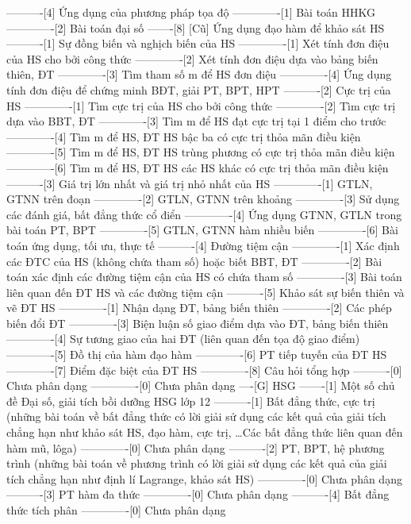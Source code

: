 ----------[4] Ứng dụng của phương pháp tọa độ
-------------[1] Bài toán HHKG
-------------[2] Bài toán đại số
-------[8] [Cũ] Ứng dụng đạo hàm để khảo sát HS
----------[1] Sự đồng biến và nghịch biến của HS
-------------[1] Xét tính đơn điệu của HS cho bởi công thức
-------------[2] Xét tính đơn điệu dựa vào bảng biến thiên, ĐT
-------------[3] Tìm tham số m để HS đơn điệu
-------------[4] Ứng dụng tính đơn điệu để chứng minh BĐT, giải PT, BPT, HPT
----------[2] Cực trị của HS
-------------[1] Tìm cực trị của HS cho bởi công thức
-------------[2] Tìm cực trị dựa vào BBT, ĐT
-------------[3] Tìm m để HS đạt cực trị tại 1 điểm cho trước
-------------[4] Tìm m để HS, ĐT HS bậc ba có cực trị thỏa mãn điều kiện
-------------[5] Tìm m để HS, ĐT HS trùng phương có cực trị thỏa mãn điều kiện
-------------[6] Tìm m để HS, ĐT HS các HS khác có cực trị thỏa mãn điều kiện
----------[3] Giá trị lớn nhất và giá trị nhỏ nhất của HS
-------------[1] GTLN, GTNN trên đoạn
-------------[2] GTLN, GTNN trên khoảng
-------------[3] Sử dụng các đánh giá, bất đẳng thức cổ điển
-------------[4] Ứng dụng GTNN, GTLN trong bài toán PT, BPT
-------------[5] GTLN, GTNN hàm nhiều biến
-------------[6] Bài toán ứng dụng, tối ưu, thực tế
----------[4] Đường tiệm cận
-------------[1] Xác định các ĐTC của HS (không chứa tham số) hoặc biết BBT, ĐT
-------------[2] Bài toán xác định các đường tiệm cận của HS có chứa tham số
-------------[3] Bài toán liên quan đến ĐT HS và các đường tiệm cận
----------[5] Khảo sát sự biến thiên và vẽ ĐT HS
-------------[1] Nhận dạng ĐT, bảng biến thiên
-------------[2] Các phép biến đổi ĐT
-------------[3] Biện luận số giao điểm dựa vào ĐT, bảng biến thiên
-------------[4] Sự tương giao của hai ĐT (liên quan đến tọa độ giao điểm)
-------------[5] Đồ thị của hàm đạo hàm
-------------[6] PT tiếp tuyến của ĐT HS
-------------[7] Điểm đặc biệt của ĐT HS
-------------[8] Câu hỏi tổng hợp
----------[0] Chưa phân dạng
-------------[0] Chưa phân dạng
----[G] HSG
-------[1] Một số chủ đề Đại số, giải tích bồi dưỡng HSG lớp 12
----------[1] Bất đẳng thức, cực trị (những bài toán về bất đẳng thức có lời giải sử dụng các kết quả của giải tích chẳng hạn như khảo sát HS, đạo hàm, cực trị, \ldots Các bất đẳng thức liên quan đến hàm mũ, lôga)
-------------[0] Chưa phân dạng
----------[2] PT, BPT, hệ phương trình (những bài toán về phương trình có lời giải sử dụng các kết quả của giải tích chẳng hạn như định lí Lagrange, khảo sát HS)
-------------[0] Chưa phân dạng
----------[3] PT hàm đa thức
-------------[0] Chưa phân dạng
----------[4] Bất đẳng thức tích phân
-------------[0] Chưa phân dạng
